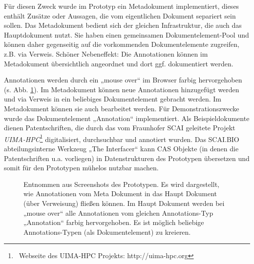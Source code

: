  
Für diesen Zweck wurde im Prototyp ein Metadokument implementiert, dieses enthält Zusätze oder Aussagen, die vom eigentlichen Dokument separiert sein sollen. Das Metadokument bedient sich der gleichen Infrastruktur, die auch das Hauptdokument nutzt. Sie haben einen  gemeinsamen Dokumentelement-Pool und können daher gegenseitig auf die vorkommenden Dokumentelemente zugreifen, z.B. via Verweis. Schöner Nebeneffekt: Die Annotationen können im Metadokument übersichtlich angeordnet und dort ggf. dokumentiert werden.

 
Annotationen werden durch ein „mouse over“ im Browser farbig hervorgehoben (s. Abb. \ref{annotation}). Im Metadokument können neue Annotationen hinzugefügt werden und via Verweis in ein beliebiges Dokumentelement gebracht werden. Im Metadokument können sie auch bearbeitet werden. Für Demonstrationszwecke wurde das Dokumentelement „Annotation“ implementiert. Als Beispieldokumente dienen Patentschriften, die durch das vom Fraunhofer SCAI geleitete Projekt \emph{UIMA-HPC}\footnote{~Webseite des UIMA-HPC Projekts: http://uima-hpc.org} digitalisiert, durchsuchbar und annotiert wurden. Das SCAI.BIO abteilungsinterne Werkzeug „The Interfacer“ kann CAS Objekte (in denen die Patentschriften u.a. vorliegen) in Datenstrukturen des Prototypen übersetzen und somit für den Prototypen mühelos nutzbar machen.

 
\begin{figure}[h!]
\centering
\advance\leftskip-2.5cm
\caption[Hauptdokument und Metadokument]{ Entnommen aus Screenshots des Prototypen. Es wird dargestellt, wie Annotationen vom Meta Dokument in das Haupt Dokument (über Verweisung) fließen können. Im Haupt Dokument werden bei „mouse over“ alle Annotationen vom gleichen Annotations-Typ „Annotation“ farbig hervorgehoben. Es ist möglich beliebige Annotations-Typen (als Dokumentelement) zu kreieren. }\label{annotation}
\end{figure}
 
